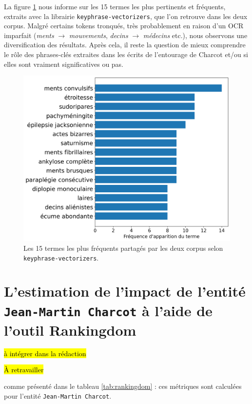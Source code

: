 La figure \ref{fig:patternrank_partage} nous informe sur les 15 termes les plus pertinents et fréquents, extraits avec la librairie \texttt{keyphrase-vectorizers}, que l'on retrouve dans les deux corpus. Malgré certains tokens tronqués, très probablement en raison d'un \textsc{OCR} imparfait (\textit{ments} $\rightarrow$ \textit{mouvements}, \textit{decins} $\rightarrow$ \textit{médecins} etc.), nous observons une diversification des résultats. Après cela, il reste la question de mieux comprendre le rôle des phrases-clés extraites dans les écrits de l'entourage de Charcot et/ou si elles sont vraiment significatives ou pas. 

\begin{figure}[!h]
    \centering
    \includegraphics[width=1\textwidth]{img/termes_partages.png}
    \caption{Les 15 termes les plus fréquents partagés par les deux corpus selon \texttt{keyphrase-vectorizers}.}
    \label{fig:patternrank_partage}
\end{figure}

\section{L'estimation de l'impact de l'entité \texttt{Jean-Martin Charcot} à l'aide de l'outil Rankingdom}
\label{sect:rankingdom}
\hl{à intégrer dans la rédaction}

\hl{À retravailler}

comme présenté dans le tableau \ref{tab:rankingdom} : ces métriques sont calculées pour l'entité \texttt{Jean-Martin Charcot}.

